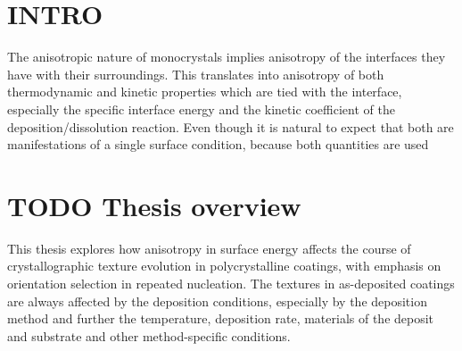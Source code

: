 \section{INTRO}






The anisotropic nature of monocrystals implies anisotropy of the interfaces they have with their surroundings. This translates into anisotropy of both thermodynamic and kinetic properties which are tied with the interface, especially the specific interface energy and the kinetic coefficient of the deposition/dissolution reaction. Even though it is natural to expect that both are manifestations of a single surface condition, because both quantities are used 



\section{TODO Thesis overview}
This thesis explores how anisotropy in surface energy affects the course of crystallographic texture evolution in polycrystalline coatings, with emphasis on orientation selection in repeated nucleation. The textures in as-deposited coatings are always affected by the deposition conditions, especially by the deposition method and further the temperature, deposition rate, materials of the deposit and substrate and other method-specific conditions. 

%
%
%



